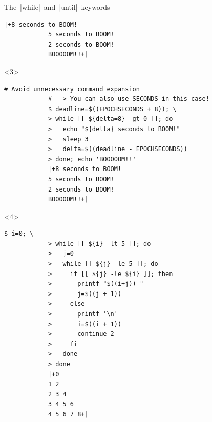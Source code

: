 \begin{frame}[fragile]{The \,\bash|while|\, and \,\bash|until|\, keywords}
\begin{onlyenv}
\begin{lstlisting}[style=MyBash]
            |+8 seconds to BOOM!
            5 seconds to BOOM!
            2 seconds to BOOM!
            BOOOOOM!!+|
        \end{lstlisting}
    \end{onlyenv}
    \begin{onlyenv}<3>
        \begin{lstlisting}[style=MyBash]
            # Avoid unnecessary command expansion
            #  -> You can also use SECONDS in this case!
            $ deadline=$((EPOCHSECONDS + 8)); \
            > while [[ ${delta=8} -gt 0 ]]; do
            >   echo "${delta} seconds to BOOM!"
            >   sleep 3
            >   delta=$((deadline - EPOCHSECONDS))
            > done; echo 'BOOOOOM!!'
            |+8 seconds to BOOM!
            5 seconds to BOOM!
            2 seconds to BOOM!
            BOOOOOM!!+|
        \end{lstlisting}
    \end{onlyenv}
    \begin{onlyenv}<4>
        \begin{lstlisting}[style=MyBash, emph={[2]{i,j}}]
            $ i=0; \
            > while [[ ${i} -lt 5 ]]; do
            >   j=0
            >   while [[ ${j} -le 5 ]]; do
            >     if [[ ${j} -le ${i} ]]; then
            >       printf "$((i+j)) "
            >       j=$((j + 1))
            >     else
            >       printf '\n'
            >       i=$((i + 1))
            >       continue 2
            >     fi
            >   done
            > done
            |+0
            1 2
            2 3 4
            3 4 5 6
            4 5 6 7 8+|
        \end{lstlisting}
    \end{onlyenv}
\end{frame}
